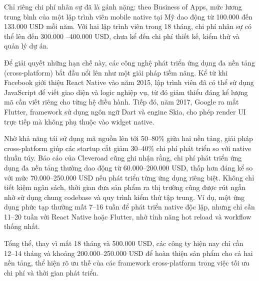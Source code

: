 \begin{flushleft}
    \hspace*{0.8cm}Chỉ riêng chi phí nhân sự đã là gánh nặng: theo Business of Apps, mức lương trung bình của một lập trình viên mobile native tại Mỹ dao động từ 100.000 đến 133.000 USD mỗi năm. Với hai lập trình viên trong 18 tháng, chi phí nhân sự có thể lên đến 300.000 --400.000 USD, chưa kể đến chi phí thiết kế, kiểm thử và quản lý dự án.
\end{flushleft}

\begin{flushleft}
    \hspace*{0.8cm}Để giải quyết những hạn chế này, các công nghệ phát triển ứng dụng đa nền tảng (cross-platform) bắt đầu nổi lên như một giải pháp tiềm năng. Kể từ khi Facebook giới thiệu React Native vào năm 2015, lập trình viên đã có thể sử dụng JavaScript để viết giao diện và logic nghiệp vụ, từ đó giảm thiểu đáng kể lượng mã cần viết riêng cho từng hệ điều hành.
Tiếp đó, năm 2017, Google ra mắt Flutter, framework sử dụng ngôn ngữ Dart và engine Skia, cho phép render UI trực tiếp mà không phụ thuộc vào widget native.
\end{flushleft}

\begin{flushleft}
    \hspace*{0.8cm}Nhờ khả năng tái sử dụng mã nguồn lên tới 50--80\% giữa hai nền tảng, giải pháp cross-platform giúp các startup cắt giảm 30--40\% chi phí phát triển so với native thuần túy.
Báo cáo của Cleveroad cũng ghi nhận rằng, chi phí phát triển ứng dụng đa nền tảng thường dao động từ 60.000--200.000 USD, thấp hơn đáng kể so với mức 70.000--250.000 USD nếu phát triển từng ứng dụng riêng biệt.
Không chỉ tiết kiệm ngân sách, thời gian đưa sản phẩm ra thị trường cũng được rút ngắn nhờ sử dụng chung codebase và quy trình kiểm thử tập trung. Ví dụ, một ứng dụng phức tạp thường mất 7--16 tuần để phát triển native độc lập, nhưng chỉ cần 11--20 tuần với React Native hoặc Flutter, nhờ tính năng hot reload và workflow thống nhất.
\end{flushleft}

\begin{flushleft}
    \hspace*{0.8cm}Tổng thể, thay vì mất 18 tháng và 500.000 USD, các công ty hiện nay chỉ cần 12--14 tháng và khoảng 200.000--250.000 USD để hoàn thiện sản phẩm cho cả hai nền tảng, thể hiện rõ ưu thế của các framework cross-platform trong việc tối ưu chi phí và thời gian phát triển.
\end{flushleft}

